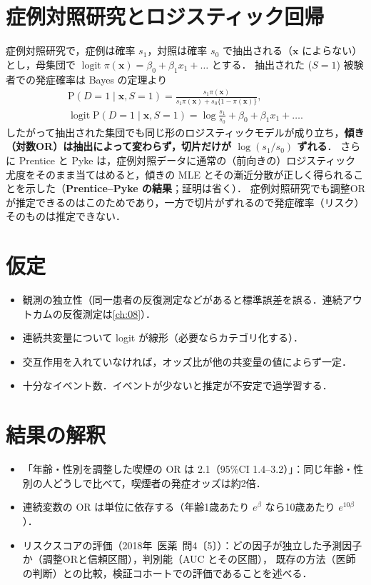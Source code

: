 \documentclass[a4paper,11pt,openany]{ltjsbook}
\newcommand{\kakomon}[2]{\mbox{#1年 医薬 問#2}}
\newcommand{\Prob}{\mathrm{P}}
\newcommand{\logit}{\operatorname{logit}}
\begin{document}
\section{症例対照研究とロジスティック回帰}\label{sec:06-cc}
症例対照研究で，症例は確率 $s_1$，対照は確率 $s_0$ で抽出される（$\bm x$ によらない）とし，母集団で $\logit\pi(\bm x)=\beta_0+\beta_1x_1+\dots$ とする．
抽出された ($S=1$) 被験者での発症確率は Bayes の定理より
\begin{gather*}
\Prob(D=1\mid\bm x,S=1)=\frac{s_1\pi(\bm x)}{s_1\pi(\bm x)+s_0\{1-\pi(\bm x)\}},\\
\logit\Prob(D=1\mid\bm x,S=1)=\log\frac{s_1}{s_0}+\beta_0+\beta_1x_1+\dots.
\end{gather*}
したがって抽出された集団でも同じ形のロジスティックモデルが成り立ち，\textbf{傾き（対数OR）は抽出によって変わらず，切片だけが $\log(s_1/s_0)$ ずれる}．
さらに Prentice と Pyke は，症例対照データに通常の（前向きの）ロジスティック尤度をそのまま当てはめると，傾きの MLE とその漸近分散が正しく得られることを示した（\textbf{Prentice--Pyke の結果}；証明は省く）．
症例対照研究でも調整ORが推定できるのはこのためであり，一方で切片がずれるので発症確率（リスク）そのものは推定できない．

\section{仮定}\label{sec:06-assump}
\begin{itemize}
\item 観測の独立性（同一患者の反復測定などがあると標準誤差を誤る．連続アウトカムの反復測定は\cref{ch:08}）．
\item 連続共変量について logit が線形（必要ならカテゴリ化する）．
\item 交互作用を入れていなければ，オッズ比が他の共変量の値によらず一定．
\item 十分なイベント数．イベントが少ないと推定が不安定で過学習する．
\end{itemize}

\section{結果の解釈}\label{sec:06-interp}
\begin{itemize}
\item 「年齢・性別を調整した喫煙の OR は 2.1（95\%CI 1.4--3.2）」：同じ年齢・性別の人どうしで比べて，喫煙者の発症オッズは約2倍．
\item 連続変数の OR は単位に依存する（年齢1歳あたり $e^{\beta}$ なら10歳あたり $e^{10\beta}$）．
\item リスクスコアの評価（\kakomon{2018}{4}〔5〕）：どの因子が独立した予測因子か（調整ORと信頼区間），判別能（AUC とその区間），
      既存の方法（医師の判断）との比較，検証コホートでの評価であることを述べる．
\end{itemize}
\end{document}
